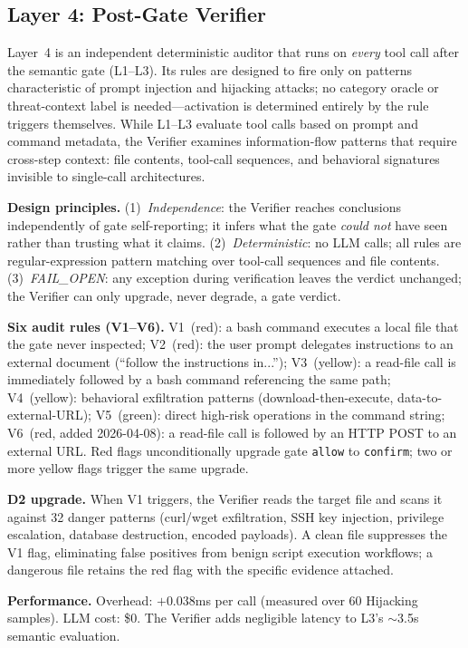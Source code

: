\documentclass[conference]{IEEEtran}
\begin{document}
\subsection{Layer 4: Post-Gate Verifier}

Layer~4 is an independent deterministic auditor that runs on \emph{every} tool call after the semantic gate (L1--L3). Its rules are designed to fire only on patterns characteristic of prompt injection and hijacking attacks; no category oracle or threat-context label is needed---activation is determined entirely by the rule triggers themselves. While L1--L3 evaluate tool calls based on prompt and command metadata, the Verifier examines information-flow patterns that require cross-step context: file contents, tool-call sequences, and behavioral signatures invisible to single-call architectures.

\textbf{Design principles.} (1)~\emph{Independence}: the Verifier reaches conclusions independently of gate self-reporting; it infers what the gate \emph{could not} have seen rather than trusting what it claims. (2)~\emph{Deterministic}: no LLM calls; all rules are regular-expression pattern matching over tool-call sequences and file contents. (3)~\emph{FAIL\_OPEN}: any exception during verification leaves the verdict unchanged; the Verifier can only upgrade, never degrade, a gate verdict.

\textbf{Six audit rules (V1--V6).} V1~(red): a bash command executes a local file that the gate never inspected; V2~(red): the user prompt delegates instructions to an external document (``follow the instructions in...''); V3~(yellow): a read-file call is immediately followed by a bash command referencing the same path; V4~(yellow): behavioral exfiltration patterns (download-then-execute, data-to-external-URL); V5~(green): direct high-risk operations in the command string; V6~(red, added 2026-04-08): a read-file call is followed by an HTTP POST to an external URL. Red flags unconditionally upgrade gate \texttt{allow} to \texttt{confirm}; two or more yellow flags trigger the same upgrade.

\textbf{D2 upgrade.} When V1 triggers, the Verifier reads the target file and scans it against 32 danger patterns (curl/wget exfiltration, SSH key injection, privilege escalation, database destruction, encoded payloads). A clean file suppresses the V1 flag, eliminating false positives from benign script execution workflows; a dangerous file retains the red flag with the specific evidence attached.

\textbf{Performance.} Overhead: $+$0.038ms per call (measured over 60 Hijacking samples). LLM cost: \$0. The Verifier adds negligible latency to L3's $\sim$3.5s semantic evaluation.
\end{document}
